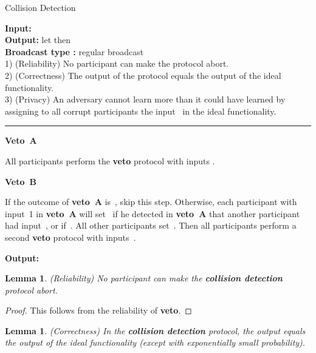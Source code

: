 \documentclass[11pt]{article}
\newtheorem{lemma}[theorem]{Lemma}
\begin{document}
\begin{protocol}
\caption{Collision Detection} \label{prot:collision-detection}

{\bf Input:}  \\
{\bf Output:} let  then~  \\
{\bf Broadcast type :}  regular broadcast\\
1) (Reliability) No participant can make the protocol abort.\\
2) (Correctness) The output of the protocol equals the output of
the ideal functionality.\\
3) (Privacy)  An adversary cannot learn more than it could have
learned by assigning to all corrupt participants the input~ in
the ideal functionality.

\vspace{4pt} \hrule \vspace{4pt}

{\bf Veto~A}

All participants perform the \textbf{veto} protocol with inputs
.\\

\vspace{-.4cm}

{\bf Veto~B}

If the outcome of \textbf{veto~A} is~, skip this step. Otherwise,
each participant with input~1 in \textbf{veto~A} will set~ if
he detected in \textbf{veto~A} that another participant had
input~, or if~. All other participants set~. Then
all participants perform a second \textbf{veto} protocol with
inputs~.\\

\vspace{-.4cm}

{\bf Output:} 

\end{protocol}


\begin{lemma}(Reliability)
No participant can make the \textbf{collision detection} protocol
abort.
\end{lemma}
\begin{proof}
This follows from the reliability of \textbf{veto}.
\end{proof}

\begin{lemma}(Correctness)
In the \textbf{collision detection} protocol, the output equals the
output of the ideal functionality (except with exponentially small
probability).
\end{lemma}
\end{document}
